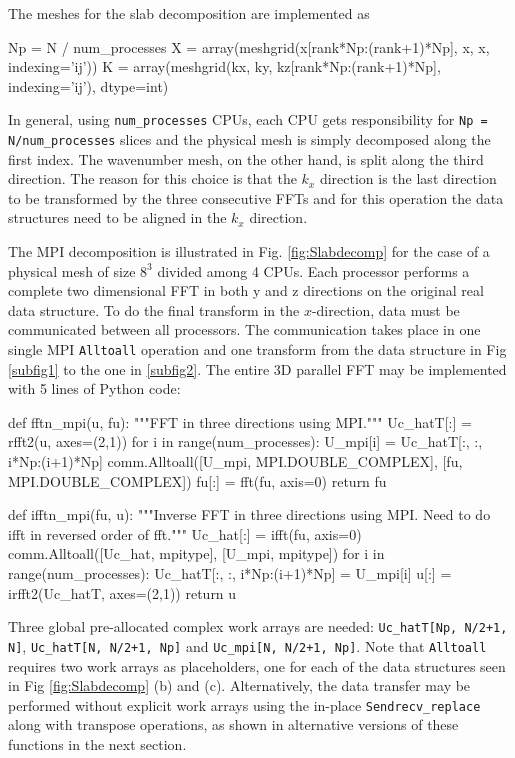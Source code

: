 \documentclass[11pt, oneside]{article}
\newcommand{\inpyth}{\lstinline[style=pythonstyle, basicstyle=\ttfamily]} %[]%
\begin{document}
The meshes for the slab decomposition are implemented as

\begin{python}
Np = N / num_processes
X = array(meshgrid(x[rank*Np:(rank+1)*Np], x, x, indexing='ij'))
K = array(meshgrid(kx, ky, kz[rank*Np:(rank+1)*Np],
                   indexing='ij'), dtype=int)
\end{python}
In general, using \inpyth{num_processes} CPUs, each CPU gets responsibility for \inpyth{Np = N/num_processes} slices and the physical mesh is simply decomposed along the first index. The wavenumber mesh, on the other hand, is split along the third direction. The reason for this choice is that the $k_x$ direction is the last direction to be transformed by the three consecutive FFTs and for this operation the data structures need to be aligned in the $k_x$ direction.


The MPI decomposition is illustrated in Fig. \ref{fig:Slabdecomp} for the case of a physical mesh of size $8^3$ divided among 4 CPUs. Each processor performs a complete two dimensional FFT in both y and z directions on the original real data structure. To do the final transform in the $x$-direction, data must be communicated between all processors. The communication takes place in one single MPI \inpyth{Alltoall} operation and one transform from the data structure in Fig \ref{subfig1} to the one in \ref{subfig2}. The entire 3D parallel FFT may be implemented with 5 lines of Python code:

\begin{python}
def fftn_mpi(u, fu):
    """FFT in three directions using MPI."""
    Uc_hatT[:] = rfft2(u, axes=(2,1))
    for i in range(num_processes):
        U_mpi[i] = Uc_hatT[:, :, i*Np:(i+1)*Np]
    comm.Alltoall([U_mpi, MPI.DOUBLE_COMPLEX], [fu, MPI.DOUBLE_COMPLEX])
    fu[:] = fft(fu, axis=0)
    return fu

def ifftn_mpi(fu, u):
    """Inverse FFT in three directions using MPI.
       Need to do ifft in reversed order of fft."""
    Uc_hat[:] = ifft(fu, axis=0)
    comm.Alltoall([Uc_hat, mpitype], [U_mpi, mpitype])
    for i in range(num_processes):
        Uc_hatT[:, :, i*Np:(i+1)*Np] = U_mpi[i]
    u[:] = irfft2(Uc_hatT, axes=(2,1))
    return u
\end{python}
Three global pre-allocated complex work arrays are needed: \inpyth{Uc_hatT[Np, N/2+1, N]}, \inpyth{Uc_hatT[N, N/2+1, Np]} and \inpyth{Uc_mpi[N, N/2+1, Np]}.
Note that  \inpyth{Alltoall} requires two work arrays as placeholders, one for each of the data structures seen in Fig \ref{fig:Slabdecomp} (b) and (c). Alternatively, the data transfer may be performed without explicit work arrays using the in-place \inpyth{Sendrecv_replace} along with transpose operations, as shown in alternative versions of these functions in the next section.
\end{document}
